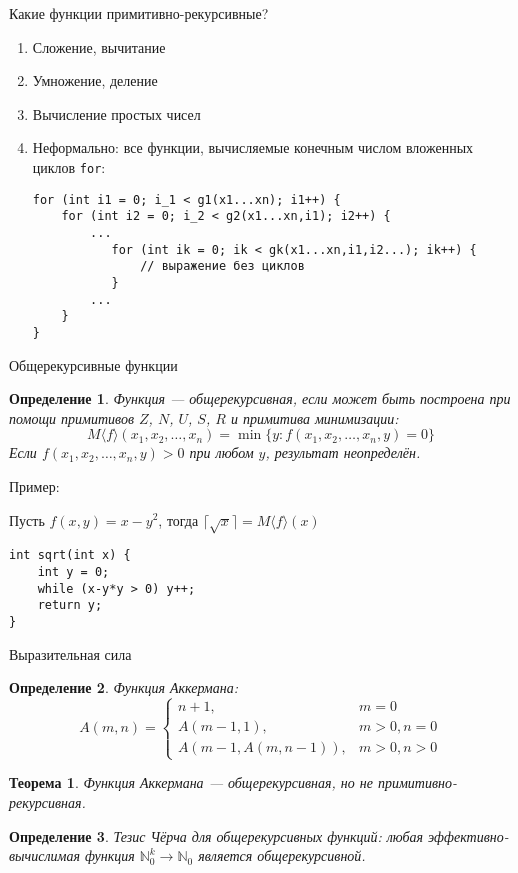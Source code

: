 \documentclass[aspectratio=169]{beamer}
\newtheorem{thm}{Теорема}[section]
\newtheorem{dfn}{Определение}[section]
\begin{document}
\begin{frame}[fragile]{Какие функции примитивно-рекурсивные?}
\begin{enumerate}
\item Сложение, вычитание\pause
\item Умножение, деление\pause
\item Вычисление простых чисел\pause
\item Неформально: все функции, вычисляемые конечным числом вложенных циклов \verb!for!:

\begin{verbatim}
for (int i1 = 0; i_1 < g1(x1...xn); i1++) {
    for (int i2 = 0; i_2 < g2(x1...xn,i1); i2++) {
        ...
           for (int ik = 0; ik < gk(x1...xn,i1,i2...); ik++) {
               // выражение без циклов
           }
        ...
    }
}
\end{verbatim}
\end{enumerate}
\end{frame}

\begin{frame}[fragile]{Общерекурсивные функции}
\begin{dfn}
Функция --- общерекурсивная, если может быть построена при помощи
примитивов $Z$, $N$, $U$, $S$, $R$ и примитива минимизации:
$$M\langle f \rangle (x_1,x_2,\dots,x_n) = \min\{y: f(x_1,x_2,\dots,x_n,y) = 0\}$$
Если $f(x_1,x_2,\dots,x_n,y) > 0$ при любом $y$, результат неопределён.
\end{dfn}\pause


Пример:

Пусть $f(x,y) = x-y^2$, тогда $\lceil\sqrt{x}\rceil = M\langle f\rangle (x)$

\begin{verbatim}
int sqrt(int x) {
    int y = 0;
    while (x-y*y > 0) y++;
    return y;
}
\end{verbatim}

\end{frame}

\begin{frame}{Выразительная сила}
\begin{dfn}
Функция Аккермана:
$$A(m,n) = \left\{\begin{array}{ll}
  n+1,&m = 0\\
  A(m-1,1),&m > 0, n = 0\\
  A(m-1,A(m,n-1)),&m > 0, n > 0
\end{array}\right.$$
\end{dfn}

\begin{thm}
Функция Аккермана --- общерекурсивная, но не примитивно-рекурсивная.
\end{thm}\pause

\begin{dfn}
Тезис Чёрча для общерекурсивных функций: любая эффективно-вычислимая
функция $\mathbb{N}^k_0\to\mathbb{N}_0$ является общерекурсивной.
\end{dfn}
\end{frame}
\end{document}

